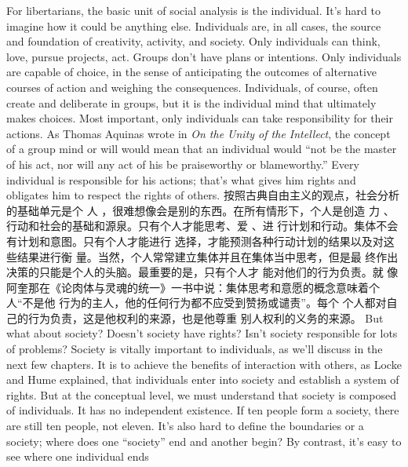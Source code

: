\begin{paracol}{2}

For libertarians, the basic unit of social analysis is the individual. It's hard to imagine how it could be anything else. Individuals are, in all cases, the source and foundation of creativity,
activity, and society. Only individuals can think, love, pursue
projects, act. Groups don't have plans or intentions. Only individuals are capable of choice, in the sense of anticipating the
outcomes of alternative courses of action and weighing the consequences. Individuals, of course, often create and deliberate in
groups, but it is the individual mind that ultimately makes
choices. Most important, only individuals can take responsibility for their actions. As Thomas Aquinas wrote in \textit{On the Unity of the Intellect}, the concept of a group mind or will would mean
that an individual would ``not be the master of his act, nor will
any act of his be praiseworthy or blameworthy.'' Every individual is responsible for his actions; that's what gives him rights
and obligates him to respect the rights of others.
\switchcolumn
按照古典自由主义的观点，社会分析的基础单元是个
人 ，很难想像会是别的东西。在所有情形下，个人是创造
力 、行动和社会的基础和源泉。只有个人才能思考、爱 、进
行计划和行动。集体不会有计划和意图。只有个人才能进行
选择，才能预测各种行动计划的结果以及对这些结果进行衡
量。当然，个人常常建立集体并且在集体当中思考，但是最
终作出决策的只能是个人的头脑。最重要的是，只有个人才
能对他们的行为负责。就 像阿奎那在《论肉体与灵魂的统一》一书中说：集体思考和意愿的概念意味着个人“不是他
行为的主人，他的任何行为都不应受到赞扬或谴责”。每个
个人都对自己的行为负责，这是他权利的来源，也是他尊重
别人权利的义务的来源。
\switchcolumn*
But what about society? Doesn't society have rights? Isn't
society responsible for lots of problems? Society is vitally important to individuals, as we'll discuss in the next few chapters. It is
to achieve the benefits of interaction with others, as Locke and
Hume explained, that individuals enter into society and establish a system of rights. But at the conceptual level, we must understand that society is composed of individuals. It has no
independent existence. If ten people form a society, there are
still ten people, not eleven. It's also hard to define the boundaries or a society; where does one ``society'' end and another
begin? By contrast, it's easy to see where one individual ends

\end{paracol}
